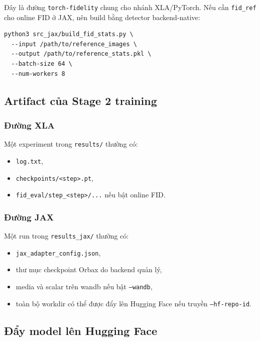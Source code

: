 Đây là đường \texttt{torch-fidelity} chung cho nhánh XLA/PyTorch. Nếu cần
\texttt{fid\_ref} cho online FID ở JAX, nên build bằng detector backend-native:

\begin{lstlisting}[style=rae]
python3 src_jax/build_fid_stats.py \
  --input /path/to/reference_images \
  --output /path/to/reference_stats.pkl \
  --batch-size 64 \
  --num-workers 8
\end{lstlisting}

\subsection{Artifact của Stage 2 training}

\subsubsection{Đường XLA}

Một experiment trong \texttt{results/} thường có:

\begin{itemize}[leftmargin=1.5em]
  \item \texttt{log.txt},
  \item \texttt{checkpoints/<step>.pt},
  \item \texttt{fid\_eval/step\_<step>/...} nếu bật online FID.
\end{itemize}

\subsubsection{Đường JAX}

Một run trong \texttt{results\_jax/} thường có:

\begin{itemize}[leftmargin=1.5em]
  \item \texttt{jax\_adapter\_config.json},
  \item thư mục checkpoint Orbax do backend quản lý,
  \item media và scalar trên wandb nếu bật \texttt{--wandb},
  \item toàn bộ workdir có thể được đẩy lên Hugging Face nếu truyền
  \texttt{--hf-repo-id}.
\end{itemize}

\subsection{Đẩy model lên Hugging Face}

